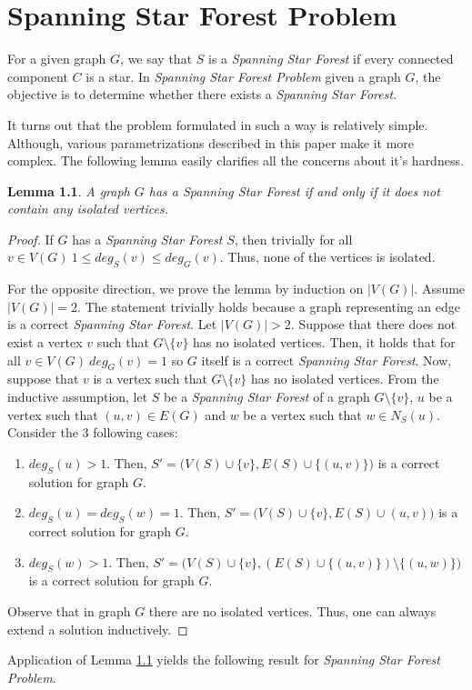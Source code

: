 \documentclass[en]{pracamgr}
\newtheorem{lemma}{Lemma}
\newcommand{\ssf}{\emph{Spanning Star Forest}}
\newcommand{\ssfp}{\emph{Spanning Star Forest Problem}}
\begin{document}
\chapter{Spanning Star Forest Problem}\label{r:losers}

For a given graph $G$, we say that $S$ is a \ssf{} if every connected component $C$ is a star. In \ssfp{} given a graph $G$, the objective is to determine whether there exists a \ssf{}.

It turns out that the problem formulated in such a way is relatively simple. Although, various parametrizations described in this paper make it more complex. The following lemma easily clarifies all the concerns about it's hardness.

\begin{lemma}\label{SSF lemma}
 A graph $G$ has a \ssf{} if and only if it does not contain any isolated vertices.
\end{lemma}

\begin{proof}
	If $G$ has a \ssf{} $S$, then trivially for all $v \in V(G)\ 1 \leq deg_S(v) \leq deg_G(v)$. Thus, none of the vertices is isolated.
	
	For the opposite direction, we prove the lemma by induction on $|V(G)|$. Assume $|V(G)|=2$. The statement trivially holds because a graph representing an edge is a correct \ssf. Let $|V(G)| >2$. Suppose that there does not exist a vertex $v$ such that $G \setminus \{v\}$ has no isolated vertices. Then, it holds that for all $v \in V(G)\ deg_G(v)=1$ so $G$ itself	is a correct \ssf{}. Now, suppose that $v$ is a vertex such that $G \setminus \{v\}$ has no isolated vertices. From the inductive assumption, let $S$ be a \ssf{} of a graph $G \setminus \{v\}$, $u$ be a vertex such that $(u,v) \in E(G)$ and $w$ be a vertex such that $w \in N_S(u)$. Consider the 3 following cases:
	\begin{enumerate}
		\item $deg_S(u) > 1$. Then, $S'=\big(V(S) \cup \{v\}, E(S) \cup \{(u,v)\}\big)$ is a correct solution for graph $G$.
		\item $deg_S(u) = deg_S(w) = 1$. Then, $S'=\big(V(S) \cup \{v\}, E(S) \cup
		(u,v)\big)$ is a correct solution for graph $G$.
		\item $deg_S(w) > 1$. Then, $S'=\big(V(S) \cup \{v\}, 
		(E(S) \cup \{(u,v)\}) \setminus \{(u,w)\}\big)$ is a correct solution for graph $G$.
	\end{enumerate}
		Observe that in graph $G$ there are no isolated vertices. Thus, one can always extend a solution inductively.
	
\end{proof}
	Application of Lemma \ref{SSF lemma} yields the following result for \ssfp{}.
\end{document}
